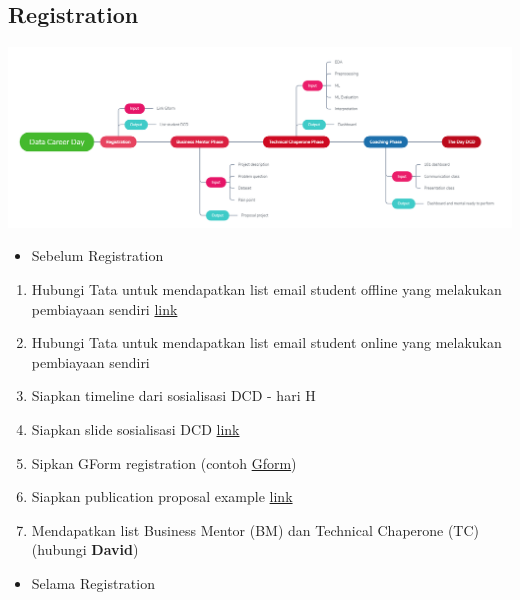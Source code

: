 \documentclass[
]{book}
\providecommand{\tightlist}{%
  \setlength{\itemsep}{0pt}\setlength{\parskip}{0pt}}
\begin{document}
\hypertarget{registration}{%
\subsection{Registration}\label{registration}}

\includegraphics{assets/workflow.png}

\begin{itemize}
\tightlist
\item
  Sebelum Registration
\end{itemize}

\begin{enumerate}
\def\labelenumi{\arabic{enumi}.}
\tightlist
\item
  Hubungi Tata untuk mendapatkan list email student offline yang melakukan pembiayaan sendiri \href{https://docs.google.com/spreadsheets/d/1iZy0AaFASL7IY5BIGZmaOsIqkdX6LR6Mo2gpJZEG2KA/edit\#gid=1637612767}{link}
\item
  Hubungi Tata untuk mendapatkan list email student online yang melakukan pembiayaan sendiri
\item
  Siapkan timeline dari sosialisasi DCD - hari H
\item
  Siapkan slide sosialisasi DCD \href{https://docs.google.com/presentation/d/1acPcUvZG85oEJsLtOGJx3FINGa8Rrhv-CBt-tqAJG_M/edit\#slide=id.p1}{link}
\item
  Sipkan GForm registration (contoh \href{http://bit.ly/registdcd9}{Gform})
\item
  Siapkan publication proposal example \href{http://bit.ly/publicationexample}{link}
\item
  Mendapatkan list Business Mentor (BM) dan Technical Chaperone (TC) (hubungi \textbf{David})
\end{enumerate}

\begin{itemize}
\tightlist
\item
  Selama Registration
\end{itemize}
\end{document}
